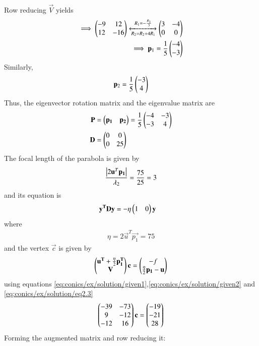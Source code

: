\documentclass[journal,12pt,twocolumn]{IEEEtran}
\begin{document}
\begin{enumerate}
\begin{align}
\end{align}
Row reducing $\vec{V}$ yields
\begin{align}
\implies
\begin{pmatrix}-9&12\\12&-16\end{pmatrix}\xleftrightarrow[R_2=R_2+4R_1]{R_1=-\frac{R_1}{3}}\begin{pmatrix}3&-4\\0&0\end{pmatrix}\\
\implies\mathbf{p}_1=\frac{1}{5}\begin{pmatrix}-4\\-3\end{pmatrix} \label{eq:conics/ex/solution/eq2.3}
\end{align}
Similarly, 
\begin{align}
\mathbf{p}_2=\frac{1}{5}\begin{pmatrix}-3\\4\end{pmatrix} 
\end{align}
%
Thus, the eigenvector rotation matrix and the eigenvalue matrix are
\begin{align}
\mathbf{P}&=\begin{pmatrix}\mathbf{p_1}&\mathbf{p_2}\end{pmatrix}=\frac{1}{5}\begin{pmatrix}-4&-3\\ -3 &4\end{pmatrix} \\
\mathbf{D}&=\begin{pmatrix}0&0\\0&25\end{pmatrix}
\end{align}
The focal length of the parabola is given by 
\begin{align}
\frac{\left\vert2\mathbf{u}^T\mathbf{p_1}\right\vert}{\lambda_2}
    = \frac{75}{25}=3
\end{align}
and its equation is
\begin{align}
    \mathbf{y^T}\mathbf{D}\mathbf{y}&=-\eta\begin{pmatrix}1&0\end{pmatrix}\mathbf{y}\label{eq:conics/ex/solution/eq2.4}
\end{align}
where
\begin{align}
    \eta=2\vec{u}^T\vec{p_1}=75
\end{align}
and the vertex $\vec{c}$ is given by 
\begin{align}
    \begin{pmatrix}\mathbf{u^T}+\frac{\eta}{2}\mathbf{p_1^T} \\ \mathbf{V}\end{pmatrix}\mathbf{c}=
    \begin{pmatrix}-f \\\frac{\eta}{2}\mathbf{p_1}-\mathbf{u}\end{pmatrix} 
\end{align}
using equations \eqref{eq:conics/ex/solution/given1},\eqref{eq:conics/ex/solution/given2} and \eqref{eq:conics/ex/solution/eq2.3}
\begin{align}
    \begin{pmatrix}-39& -73 \\ 9 & -12 \\  -12 & 16 \end{pmatrix}\mathbf{c}=\begin{pmatrix}-19 \\ -21\\ 28\end{pmatrix} \label{eq:conics/ex/solution/eqcen}
\end{align}
Forming the augmented matrix and row reducing it:
\begin{align}

\end{align}
\end{enumerate}
\end{document}
